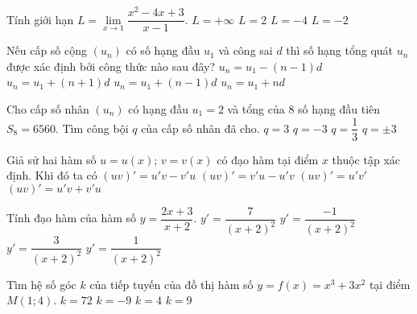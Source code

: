\begin{ex}%
Tính giới hạn $L=\lim\limits_{x\rightarrow 1}\dfrac{x^2-4x+3}{x-1}$.
\choice
{$L=+\infty$}
{$L=2$}
{$L=-4$}
{\True $L=-2$}
\end{ex} 

\begin{ex}%
Nếu cấp số cộng $(u_n)$ có số hạng đầu $u_1$ và công sai $d$ thì số hạng tổng quát $u_n$ được xác định bởi công thức nào sau đây?
\choice
{$u_n=u_1-(n-1)d$}
{$u_n=u_1+(n+1)d$}
{\True $u_n=u_1+(n-1)d$}
{$u_n=u_1+nd$}
\end{ex}

\begin{ex}%
Cho cấp số nhân $(u_n)$ có hạng đầu $u_1=2$ và tổng của $8$ số hạng đầu tiên $S_8=6560$. Tìm công bội $q$ của cấp số nhân đã cho.
\choice
{\True $q=3$}
{$q=-3$}
{$q=\dfrac{1}{3}$}
{$q=\pm 3$}
\end{ex}

\begin{ex}%
Giả sử hai hàm số $u=u(x)$; $v=v(x)$ có đạo hàm tại điểm $x$ thuộc tập xác định. Khi đó ta có
\choice
{$(uv)'=u'v-v'u$}
{$(uv)'=v'u-u'v$}
{$(uv)'=u'v'$}
{\True $(uv)'=u'v+v'u$}
\end{ex}

\begin{ex}%
Tính đạo hàm của hàm số $y=\dfrac{2x+3}{x+2}$.
\choice
{$y'=\dfrac{7}{(x+2)^2}$}
{$y'=\dfrac{-1}{(x+2)^2}$}
{$y'=\dfrac{3}{(x+2)^2}$}
{\True $y'=\dfrac{1}{(x+2)^2}$}
\end{ex}

\begin{ex}%
Tìm hệ số góc $k$ của tiếp tuyến của đồ thị hàm số $y=f(x)=x^3+3x^2$ tại điểm $M(1;4)$.
\choice
{$k=72$}
{$k=-9$}
{$k=4$}
{\True $k=9$}
\end{ex} 

